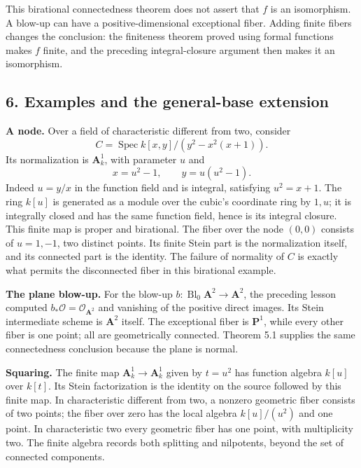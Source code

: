 \documentclass[11pt]{article}
\begin{document}
This birational connectedness theorem does not assert that \(f\) is an
isomorphism. A blow-up can have a positive-dimensional exceptional
fiber. Adding finite fibers changes the conclusion: the finiteness
theorem proved using formal functions makes \(f\) finite, and the
preceding integral-closure argument then makes it an isomorphism.

\subsection{6. Examples and the general-base
extension}\label{examples-and-the-general-base-extension}

\textbf{A node.} Over a field of characteristic different from two,
consider \[
C=\operatorname{Spec}k[x,y]/(y^2-x^2(x+1)).
\] Its normalization is \(\mathbf A^1_k\), with parameter \(u\) and \[
x=u^2-1,\qquad y=u(u^2-1).
\] Indeed \(u=y/x\) in the function field and is integral, satisfying
\(u^2=x+1\). The ring \(k[u]\) is generated as a module over the cubic's
coordinate ring by \(1,u\); it is integrally closed and has the same
function field, hence is its integral closure. This finite map is proper
and birational. The fiber over the node \((0,0)\) consists of
\(u=1,-1\), two distinct points. Its finite Stein part is the
normalization itself, and its connected part is the identity. The
failure of normality of \(C\) is exactly what permits the disconnected
fiber in this birational example.

\textbf{The plane blow-up.} For the blow-up
\(b:\operatorname{Bl}_0\mathbf A^2\to\mathbf A^2\), the preceding lesson
computed \(b_*\mathcal O=\mathcal O_{\mathbf A^2}\) and vanishing of the
positive direct images. Its Stein intermediate scheme is \(\mathbf A^2\)
itself. The exceptional fiber is \(\mathbf P^1\), while every other
fiber is one point; all are geometrically connected. Theorem 5.1
supplies the same connectedness conclusion because the plane is normal.

\textbf{Squaring.} The finite map \(\mathbf A^1_k\to\mathbf A^1_k\)
given by \(t=u^2\) has function algebra \(k[u]\) over \(k[t]\). Its
Stein factorization is the identity on the source followed by this
finite map. In characteristic different from two, a nonzero geometric
fiber consists of two points; the fiber over zero has the local algebra
\(k[u]/(u^2)\) and one point. In characteristic two every geometric
fiber has one point, with multiplicity two. The finite algebra records
both splitting and nilpotents, beyond the set of connected components.
\end{document}
